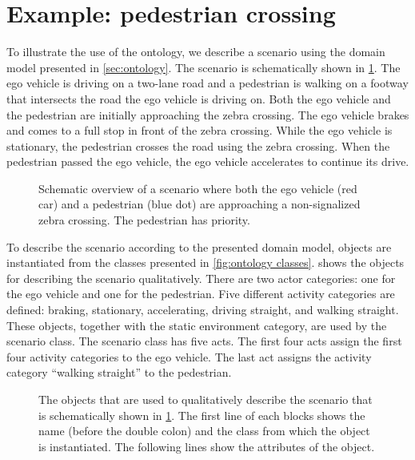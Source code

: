 \cbstart
\section{Example: pedestrian crossing}
\label{sec:example}

To illustrate the use of the ontology, we describe a scenario using the domain model presented in \cref{sec:ontology}. The scenario is schematically shown in \cref{fig:scenario overview}. The ego vehicle is driving on a two-lane road and a pedestrian is walking on a footway that intersects the road the ego vehicle is driving on. Both the ego vehicle and the pedestrian are initially approaching the zebra crossing. The ego vehicle brakes and comes to a full stop in front of the zebra crossing. While the ego vehicle is stationary, the pedestrian crosses the road using the zebra crossing. When the pedestrian passed the ego vehicle, the ego vehicle accelerates to continue its drive.
\cbend

\setlength{\figurewidth}{\linewidth}
\begin{figure}
	\centering
	
	\caption{\cbstart Schematic overview of a scenario where both the ego vehicle (red car) and a pedestrian (blue dot) are approaching a non-signalized zebra crossing. The pedestrian has priority. \cbend}
	\label{fig:scenario overview}
\end{figure}

\cbstart
To describe the scenario according to the presented domain model, objects are instantiated from the classes presented in \cref{fig:ontology classes}.  shows the objects for describing the scenario qualitatively. There are two actor categories: one for the ego vehicle and one for the pedestrian. Five different activity categories are defined: braking, stationary, accelerating, driving straight, and walking straight. These objects, together with the static environment category, are used by the scenario class. The scenario class has five acts. The first four acts assign the first four activity categories to the ego vehicle. The last act assigns the activity category ``walking straight'' to the pedestrian.
\cbend

\begin{figure}
	\centering
	
	\caption{\cbstart The objects that are used to qualitatively describe the scenario that is schematically shown in \cref{fig:scenario overview}. The first line of each blocks shows the name (before the double colon) and the class from which the object is instantiated. The following lines show the attributes of the object.\cbend}
	\label{fig:example qualitative}
\end{figure}

\cbstart
\cbend